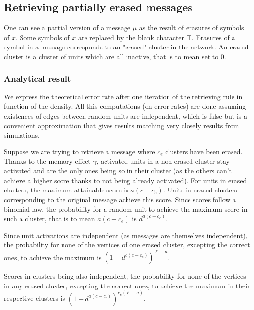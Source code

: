 \documentclass[english,10pt,twocolumn]{IEEEtran}
\theoremstyle{definition}
\begin{document}
	
	
		
	
	\subsection{Retrieving partially erased messages}		
		
	One can see a partial version of a message $\mu$ as the result of erasures of symbols of $x$. Some symbols of $x$ are replaced by the blank character $\intercal$.	Erasures of a symbol in a message corresponds to an "erased" cluster in the network. An erased cluster is a cluster of units which are all inactive, that is to mean set to $0$.
	
	\subsubsection{Analytical result}
	
	We express the theoretical error rate after one iteration of the retrieving rule in function of the density. All this computations (on error rates) are done assuming existences of edges between random units are independent, which is false but is a convenient approximation that gives results matching very closely results from simulations.
	
	Suppose we are trying to retrieve a message where $c_e$ clusters have been erased. %
	Thanks to the memory effect $\gamma$, activated units in a non-erased cluster stay activated and are the only ones being so in their cluster (as the others can't achieve a higher score thanks to not being already activated). For units in erased clusters, the maximum attainable score is $a(c - c_e)$. Units in erased clusters corresponding to the original message achieve this score. Since scores follow a binomial law, the probability for a random unit to achieve the maximum score in such a cluster, that is to mean $a(c-c_e)$ is $d^{a(c-c_e)}$.
	
	
	Since unit activations are independent (as messages are themselves independent), the probability for none of the vertices of one erased cluster, excepting the correct ones, to achieve the maximum is $\left(1 - d^	{a(c-c_e)}\right)^{\ell-a}$.
	
	Scores in clusters being also independent, the probability for none of the vertices in any erased cluster, excepting the correct ones, to achieve the maximum in their respective clusters is $\left(1 - d^	{a(c-c_e)}\right)^{c_e(\ell-a)}$.
	
\end{document}
